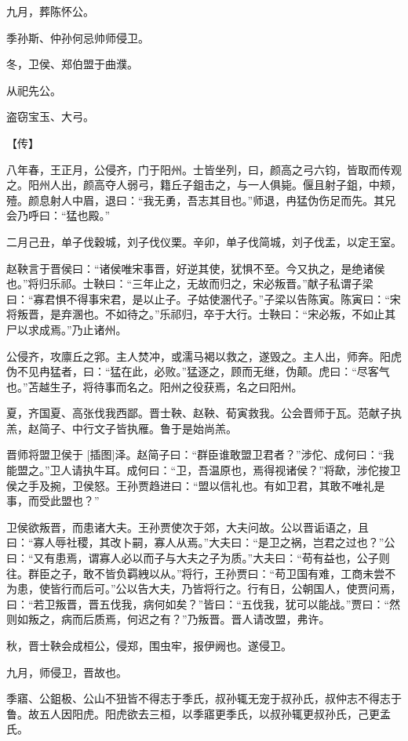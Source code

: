 \documentclass[a4paper,12pt,UTF8,twoside]{ctexbook}
\begin{document}
九月，葬陈怀公。

季孙斯、仲孙何忌帅师侵卫。

冬，卫侯、郑伯盟于曲濮。

从祀先公。

盗窃宝玉、大弓。

【传】

八年春，王正月，公侵齐，门于阳州。士皆坐列，曰，颜高之弓六钧，皆取而传观之。阳州人出，颜高夺人弱弓，籍丘子鉏击之，与一人俱毙。偃且射子鉏，中颊，殪。颜息射人中眉，退曰：“我无勇，吾志其目也。”师退，冉猛伪伤足而先。其兄会乃呼曰：“猛也殿。”

二月己丑，单子伐穀城，刘子伐仪栗。辛卯，单子伐简城，刘子伐盂，以定王室。

赵鞅言于晋侯曰：“诸侯唯宋事晋，好逆其使，犹惧不至。今又执之，是绝诸侯也。”将归乐祁。士鞅曰：“三年止之，无故而归之，宋必叛晋。”献子私谓子梁曰：“寡君惧不得事宋君，是以止子。子姑使溷代子。”子梁以告陈寅。陈寅曰：“宋将叛晋，是弃溷也。不如待之。”乐祁归，卒于大行。士鞅曰：“宋必叛，不如止其尸以求成焉。”乃止诸州。

公侵齐，攻廪丘之郛。主人焚冲，或濡马褐以救之，遂毁之。主人出，师奔。阳虎伪不见冉猛者，曰：“猛在此，必败。”猛逐之，顾而无继，伪颠。虎曰：“尽客气也。”苫越生子，将待事而名之。阳州之役获焉，名之曰阳州。

夏，齐国夏、高张伐我西鄙。晋士鞅、赵鞅、荀寅救我。公会晋师于瓦。范献子执羔，赵简子、中行文子皆执雁。鲁于是始尚羔。

晋师将盟卫侯于 [插图]泽。赵简子曰：“群臣谁敢盟卫君者？”涉佗、成何曰：“我能盟之。”卫人请执牛耳。成何曰：“卫，吾温原也，焉得视诸侯？”将歃，涉佗捘卫侯之手及捥，卫侯怒。王孙贾趋进曰：“盟以信礼也。有如卫君，其敢不唯礼是事，而受此盟也？”

卫侯欲叛晋，而患诸大夫。王孙贾使次于郊，大夫问故。公以晋诟语之，且曰：“寡人辱社稷，其改卜嗣，寡人从焉。”大夫曰：“是卫之祸，岂君之过也？”公曰：“又有患焉，谓寡人必以而子与大夫之子为质。”大夫曰：“苟有益也，公子则往。群臣之子，敢不皆负羁絏以从。”将行，王孙贾曰：“苟卫国有难，工商未尝不为患，使皆行而后可。”公以告大夫，乃皆将行之。行有日，公朝国人，使贾问焉，曰：“若卫叛晋，晋五伐我，病何如矣？”皆曰：“五伐我，犹可以能战。”贾曰：“然则如叛之，病而后质焉，何迟之有？”乃叛晋。晋人请改盟，弗许。

秋，晋士鞅会成桓公，侵郑，围虫牢，报伊阙也。遂侵卫。

九月，师侵卫，晋故也。

季寤、公鉏极、公山不狃皆不得志于季氏，叔孙辄无宠于叔孙氏，叔仲志不得志于鲁。故五人因阳虎。阳虎欲去三桓，以季寤更季氏，以叔孙辄更叔孙氏，己更孟氏。
\end{document}
